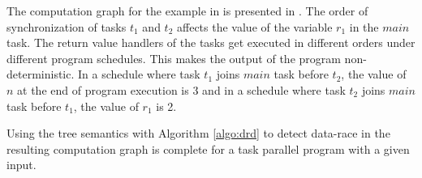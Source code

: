 The computation graph for the example in  is presented in . The order of synchronization of tasks $t_1$ and $t_2$ affects the value of the variable $r_1$ in the $main$ task. The return value handlers of the tasks get executed in different orders under different program schedules. This makes the output of the program non-deterministic. In a schedule where task $t_1$ joins $main$ task before $t_2$, the value of $n$ at the end of program execution is 3 and in a schedule where task $t_2$ joins $main$ task before $t_1$, the value of $r_1$ is 2.

\begin{theorem}
Using the tree semantics with Algorithm \ref{algo:drd} to detect data-race in the resulting computation graph is complete for a task parallel program with a given input.
\end{theorem}

